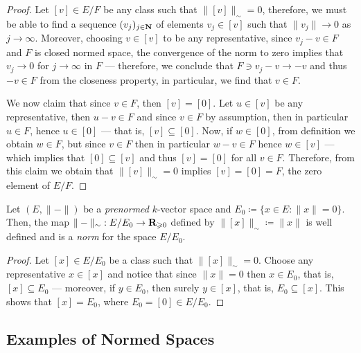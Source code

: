 \begin{proof}
Let \([v] \in E/F\) be any class such that \(\| [v] \|_{\sim} = 0\), therefore,
we must be able to find a sequence \((v_j)_{j \in \mathbf{N}}\) of elements \(v_j \in
[v]\) such that \(\| v_{j} \| \to 0\) as \(j \to \infty\). Moreover, choosing
\(v \in [v]\) to be any representative, since \(v_j - v \in F\) and \(F\) is
closed normed space, the convergence of the norm to zero implies that \(v_j \to
0\) for \(j \to \infty\) in \(F\) --- therefore, we conclude that \(F \ni v_j -
v \to -v\) and thus \(-v \in F\) from the closeness property, in particular, we
find that \(v \in F\).

We now claim that since \(v \in F\), then \([v] = [0]\). Let \(u \in [v]\) be
any representative, then \(u - v \in F\) and since \(v \in F\) by assumption,
then in particular \(u \in F\), hence \(u \in [0]\) --- that is, \([v] \subseteq
[0]\). Now, if \(w \in [0]\), from definition we obtain \(w \in F\), but since
\(v \in F\) then in particular \(w - v \in F\) hence \(w \in [v]\) --- which
implies that \([0] \subseteq [v]\) and thus \([v] = [0]\) for all \(v \in
F\). Therefore, from this claim we obtain that \(\| [v] \|_{\sim} = 0\) implies
\([v] = [0] = F\), the zero element of \(E/F\).
\end{proof}

\begin{proposition}
\label{prop:norm-out-of-prenorm}
Let \((E, \| - \|)\) be a \emph{prenormed} \(k\)-vector space and \(E_0 \coloneq
\{x \in E \colon \| x \| = 0\}\). Then, the map \(\| - \|_{\sim}: E / E_0 \to
\mathbf{R}_{\geqslant 0}\) defined by \(\| [x] \|_{\sim} \coloneq \| x \|\) is well defined
and is a \emph{norm} for the space \(E / E_0\).
\end{proposition}

\begin{proof}
Let \([x] \in E / E_0\) be a class such that \(\| [x] \|_{\sim} = 0\). Choose
any representative \(x \in [x]\) and notice that since \(\| x \| = 0\) then \(x
\in E_0\), that is, \([x] \subseteq E_0\) --- moreover, if \(y \in E_0\), then
surely \(y \in [x]\), that is, \(E_0 \subseteq [x]\). This shows that \([x] =
E_0\), where \(E_0 = [0] \in E / E_0\).
\end{proof}

\subsection{Examples of Normed Spaces}

